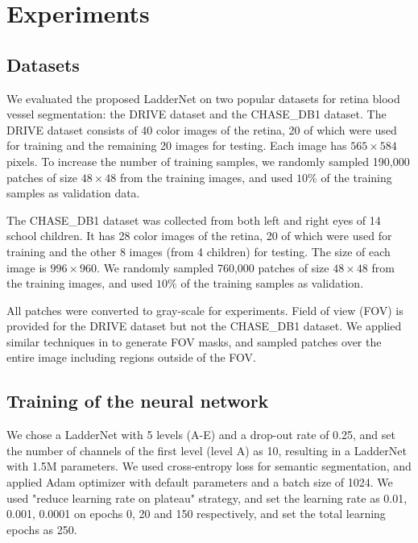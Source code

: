 \documentclass{article}
\begin{document}
\section{Experiments}
\vspace{-0.1cm}
\subsection{Datasets}
We evaluated the proposed LadderNet on two popular datasets for retina blood vessel segmentation: the DRIVE dataset and the CHASE\_DB1 dataset. The DRIVE dataset consists of 40 color images of the retina, 20 of which were used for training and the remaining 20 images for testing. Each image has $565 \times 584$ pixels. To increase the number of training samples, we randomly sampled 190,000 patches of size $48 \times 48$ from the training images, and used $10\%$ of the training samples as validation data. 
\par 
The CHASE\_DB1 dataset was collected from both left and right eyes of 14 school children. It has 28 color images of the retina, 20 of which were used for training and the other 8 images (from 4 children) for testing. The size of each image is $996 \times 960$. We randomly sampled 760,000 patches of size $48 \times 48$ from the training images, and used $10\%$ of the training samples as validation. 
\par
All patches were converted to gray-scale for experiments. Field of view (FOV) is provided for the DRIVE dataset but not the CHASE\_DB1 dataset. We applied similar techniques in \cite{soares2006retinal} to generate FOV masks, and sampled patches over the entire image including regions outside of the FOV. 

\subsection{Training of the neural network}
We chose a LadderNet with 5 levels (A-E) and a drop-out rate of 0.25, and set the number of channels of the first level (level A) as 10, resulting in a LadderNet with 1.5M parameters. We used cross-entropy loss for semantic segmentation, and applied Adam optimizer with default parameters and a batch size of 1024. We used "reduce learning rate on plateau" strategy, and set the learning rate as 0.01, 0.001, 0.0001 on epochs 0, 20 and 150 respectively, and set the total learning epochs as 250. 
\end{document}
